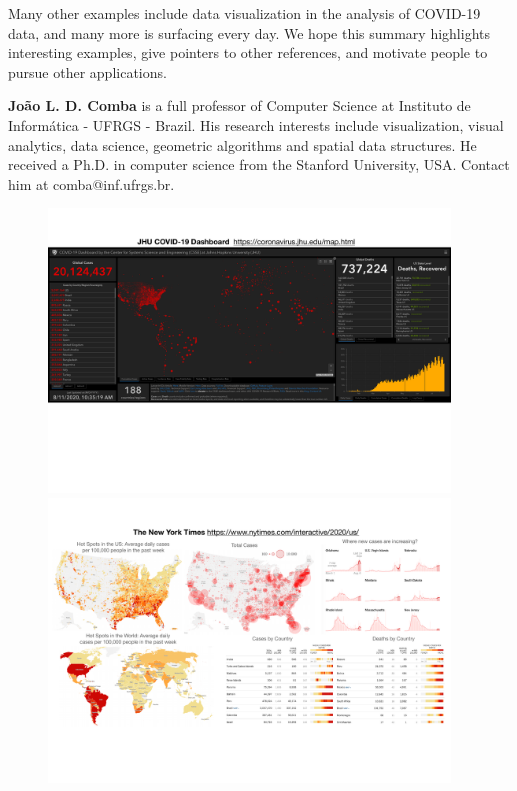 \documentclass[10pt,journal,compsoc]{IEEEtran}
\newcommand{\cv}{COVID-19\xspace}
\begin{document}
Many other examples include data visualization in the analysis of \cv data, and many more is surfacing every day. We hope this summary highlights interesting examples, give pointers to other references, and motivate people to pursue other applications.





\bigskip

\textbf{João L. D. Comba} is a full professor of Computer Science at Instituto de Informática - UFRGS - Brazil. His research interests include visualization, visual analytics, data science, geometric algorithms and spatial data structures. He received a Ph.D. in computer science from the Stanford University, USA. Contact him at comba@inf.ufrgs.br.

\begin{figure}
	\includegraphics[width=0.95\textwidth]{figures/jhu-dashboard2.pdf}
	\includegraphics[width=0.95\textwidth]{figures/ny-times.pdf}

\end{figure}
\end{document}
